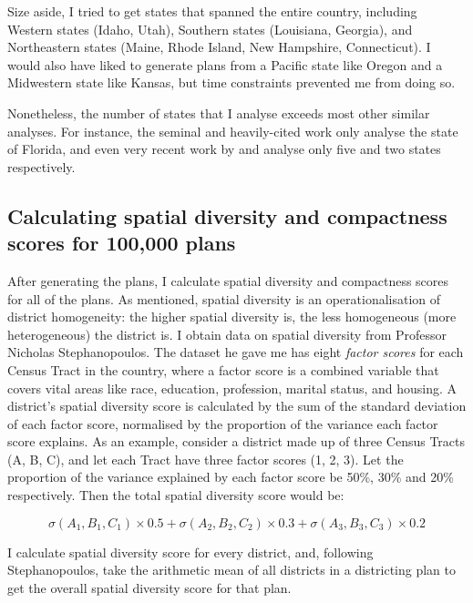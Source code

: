 \documentclass[]{article}
\begin{document}
Size aside, I tried to get states that spanned the entire country,
including Western states (Idaho, Utah), Southern states (Louisiana,
Georgia), and Northeastern states (Maine, Rhode Island, New Hampshire,
Connecticut). I would also have liked to generate plans from a Pacific
state like Oregon and a Midwestern state like Kansas, but time
constraints prevented me from doing so.

Nonetheless, the number of states that I analyse exceeds most other
similar analyses. For instance, the seminal and heavily-cited work
\cite{cr2013} only analyse the state of Florida, and even very recent
work by \cite{ddj2019recom} and \cite{s2020} analyse only five and two
states respectively.

\hypertarget{calculating-spatial-diversity-and-compactness-scores-for-100000-plans}{%
\subsection{Calculating spatial diversity and compactness scores for
100,000
plans}\label{calculating-spatial-diversity-and-compactness-scores-for-100000-plans}}

After generating the plans, I calculate spatial diversity and
compactness scores for all of the plans. As mentioned, spatial diversity
is an operationalisation of district homogeneity: the higher spatial
diversity is, the less homogeneous (more heterogeneous) the district is.
I obtain data on spatial diversity from Professor Nicholas
Stephanopoulos. The dataset he gave me has eight \emph{factor scores}
for each Census Tract in the country, where a factor score is a combined
variable that covers vital areas like race, education, profession,
marital status, and housing. A district's spatial diversity score is
calculated by the sum of the standard deviation of each factor score,
normalised by the proportion of the variance each factor score explains.
As an example, consider a district made up of three Census Tracts (A, B,
C), and let each Tract have three factor scores (1, 2, 3). Let the
proportion of the variance explained by each factor score be 50\%, 30\%
and 20\% respectively. Then the total spatial diversity score would be:

\[ \sigma(A_1, B_1, C_1) \times 0.5 + \sigma(A_2, B_2, C_2) \times 0.3 + \sigma(A_3,
B_3, C_3) \times 0.2\]

I calculate spatial diversity score for every district, and, following
Stephanopoulos, take the arithmetic mean of all districts in a
districting plan to get the overall spatial diversity score for that
plan.
\end{document}
